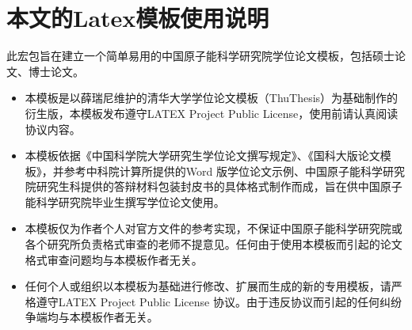 \section{本文的Latex模板使用说明}
此宏包旨在建立一个简单易用的中国原子能科学研究院学位论文模板，包括硕士论文、博士论文。

\begin{itemize}
\item 本模板是以薛瑞尼维护的清华大学学位论文模板（ThuThesis）为基础制作的衍生版，本模板发布遵守LATEX Project Public License，使用前请认真阅读协议内容。

\item 本模板依据《中国科学院大学研究生学位论文撰写规定》、《国科大版论文模板》，并参考中科院计算所提供的Word 版学位论文示例、中国原子能科学研究院研究生科提供的答辩材料包装封皮书的具体格式制作而成，旨在供中国原子能科学研究院毕业生撰写学位论文使用。

\item 本模板仅为作者个人对官方文件的参考实现，不保证中国原子能科学研究院或各个研究所负责格式审查的老师不提意见。任何由于使用本模板而引起的论文格式审查问题均与本模板作者无关。

\item 任何个人或组织以本模板为基础进行修改、扩展而生成的新的专用模板，请严格遵守LATEX Project Public License 协议。由于违反协议而引起的任何纠纷争端均与本模板作者无关。
\end{itemize}